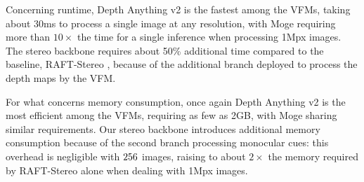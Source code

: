\documentclass[10pt,twocolumn,letterpaper]{article}
\begin{document}
Concerning runtime, Depth Anything v2 is the fastest among the VFMs, taking about 30ms to process a single image at any resolution, with Moge requiring more than $10\times$ the time for a single inference when processing 1Mpx images.
The stereo backbone requires about 50\% additional time compared to the baseline, RAFT-Stereo \cite{lipson2021raft}, because of the additional branch deployed to process the depth maps by the VFM.

For what concerns memory consumption, once again Depth Anything v2 is the most efficient among the VFMs, requiring as few as 2GB, with Moge sharing similar requirements. Our stereo backbone introduces additional memory consumption because of the second branch processing monocular cues: this overhead is negligible with $256\time256$ images, raising to about $2\times$ the memory required by RAFT-Stereo alone when dealing with 1Mpx images.
\end{document}
